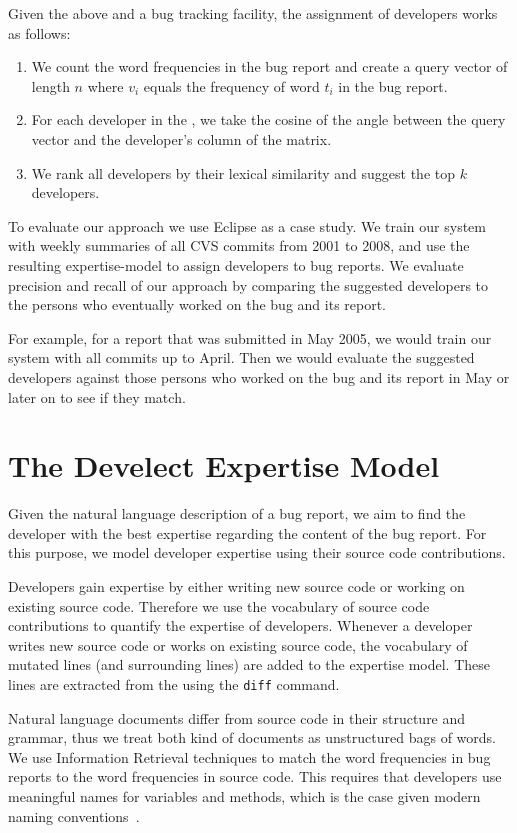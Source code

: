 Given the above \TAM and a bug tracking facility, the assignment of developers works as follows:

\begin{enumerate}
\item We count the word frequencies in the bug report and create a query vector of length $n$ where $v_i$ equals the frequency of word $t_i$ in the bug report. 
\item For each developer in the \TAM, we take the cosine of the angle between the query vector and the developer's column of the matrix.
\item We rank all developers by their lexical similarity and suggest the top $k$ developers.
\end{enumerate}

To evaluate our approach we use Eclipse as a case study. We train our system with weekly summaries of all CVS commits from 2001 to 2008, and use the resulting expertise-model to assign developers to bug reports. We evaluate precision and recall of our approach by comparing the suggested developers to the persons who eventually worked on the bug and its report.

For example, for a report that was submitted in May 2005, we would train our system with all commits up to April. Then we would evaluate the suggested developers against those persons who worked on the bug and its report in May or later on to see if they match.

 

\section{The Develect Expertise Model}\label{sec:algorithm}

Given the natural language description of a bug report, we aim to find the developer with the best expertise regarding the content of the bug report. For this purpose, we model developer expertise using their source code contributions. 

Developers gain expertise by either writing new source code or working on existing source code. Therefore we use the vocabulary of source code contributions to quantify the expertise of developers. Whenever a developer writes new source code or works on existing source code, the vocabulary of mutated lines (and surrounding lines) are added to the expertise model. These lines are extracted from the \VCS using the \verb$diff$ command.

Natural language documents differ from source code in their structure and grammar, thus we treat both kind of documents as unstructured bags of words. We use Information Retrieval techniques to match the word frequencies in bug reports to the word frequencies in source code. This requires that developers use meaningful names \eg for variables and methods, which is the case given modern naming conventions~\cite{Kuhn07a}. 

